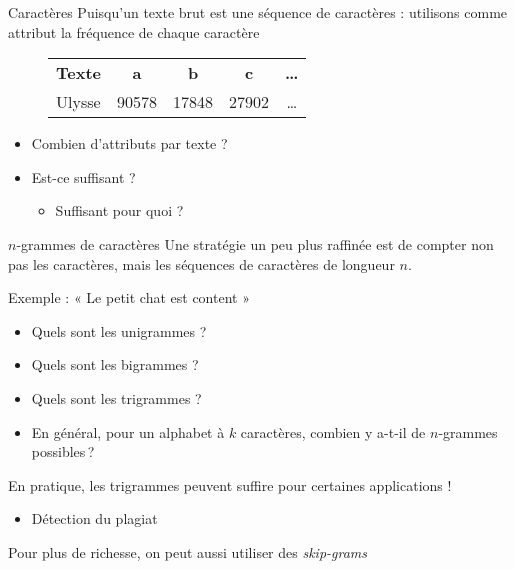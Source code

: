 \documentclass[xcolor={svgnames}, french]{beamer}
\begin{document}
\begin{frame}{Caractères}
	Puisqu'un texte brut est une séquence de caractères : utilisons comme attribut la fréquence de chaque caractère

	\begin{figure}
		\begin{tabular}{l*{4}{S}}
			{\textbf{Texte}}   & {\textbf{a}} & {\textbf{b}} & {\textbf{c}} & {\textbf{…}}\\
			Ulysse  & 90578 & 17848 & 27902 & {…}
		\end{tabular}
	\end{figure}

	\pause

	\begin{itemize}
		\item Combien d'attributs par texte ?
		\item Est-ce suffisant ?
			\begin{itemize}
				\item<+-> Suffisant pour quoi ?
			\end{itemize}
	\end{itemize}
\end{frame}

\begin{frame}{\(n\)-grammes de caractères}
	Une stratégie un peu plus raffinée est de compter non pas les caractères, mais les séquences de caractères de longueur \(n\).

	Exemple : « Le petit chat est content »

	\begin{itemize}
		\item Quels sont les unigrammes ?
		\item Quels sont les bigrammes ?
		\item Quels sont les trigrammes ?
		\item En général, pour un alphabet à \(k\) caractères, combien y a-t-il de \(n\)-grammes possibles ?
	\end{itemize}

	En pratique, les trigrammes peuvent suffire pour certaines applications !
	\begin{itemize}
		\item Détection du plagiat
	\end{itemize}

	Pour plus de richesse, on peut aussi utiliser des \emph{skip-grams}
\end{frame}
\end{document}
